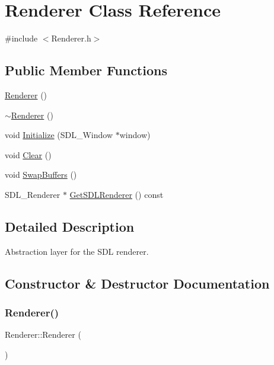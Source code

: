 \hypertarget{class_renderer}{}\section{Renderer Class Reference}
\label{class_renderer}


{\ttfamily \#include $<$Renderer.\+h$>$}

\subsection*{Public Member Functions}
\begin{DoxyCompactItemize}
\item 
\mbox{\hyperlink{class_renderer_a7ebf46f54dab9905f79b80f7fddb76a6}{Renderer}} ()
\item 
\mbox{\hyperlink{class_renderer_afeee408862d5bd6255a6882d47e6d5cd}{$\sim$\+Renderer}} ()
\item 
void \mbox{\hyperlink{class_renderer_aa3d40d03451dab486e098b8f337c0f87}{Initialize}} (S\+D\+L\+\_\+\+Window $\ast$window)
\item 
void \mbox{\hyperlink{class_renderer_aeedbc2ffdccf51fa1384100446488746}{Clear}} ()
\item 
void \mbox{\hyperlink{class_renderer_a09f2d3c7bac8ff314d860b9958a8531c}{Swap\+Buffers}} ()
\item 
S\+D\+L\+\_\+\+Renderer $\ast$ \mbox{\hyperlink{class_renderer_a10f0554599d4fde891984d41d0e45c05}{Get\+S\+D\+L\+Renderer}} () const
\end{DoxyCompactItemize}


\subsection{Detailed Description}
Abstraction layer for the S\+DL renderer. 

\subsection{Constructor \& Destructor Documentation}
\mbox{\label{class_renderer_a7ebf46f54dab9905f79b80f7fddb76a6}} 
\subsubsection{\texorpdfstring{Renderer()}{Renderer()}}
{\footnotesize\ttfamily Renderer\+::\+Renderer (\begin{DoxyParamCaption}{ }\end{DoxyParamCaption})}

